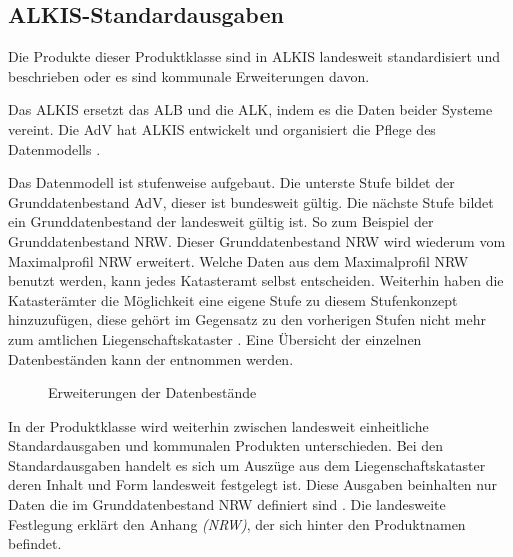 \subsection{ALKIS-Standardausgaben}

Die Produkte dieser Produktklasse sind in \acs{ALKIS} landesweit standardisiert und beschrieben oder es sind kommunale Erweiterungen davon.

Das \acf{ALKIS} ersetzt das \acf{ALB} und die \acf{ALK}, indem es die Daten beider Systeme vereint. Die \acs{AdV} hat \acs{ALKIS} entwickelt und organisiert die Pflege des Datenmodells \autocite[vgl.][]{adv-alkis}.

Das Datenmodell ist stufenweise aufgebaut. Die unterste Stufe bildet der Grunddatenbestand AdV, dieser ist bundesweit gültig. Die nächste Stufe bildet ein Grunddatenbestand der landesweit gültig ist.
So zum Beispiel der Grunddatenbestand NRW. Dieser Grunddatenbestand NRW wird wiederum vom Maximalprofil NRW erweitert.
Welche Daten aus dem Maximalprofil NRW benutzt werden, kann jedes Katasteramt selbst entscheiden.
Weiterhin haben die Katasterämter die Möglichkeit eine eigene Stufe zu diesem Stufenkonzept hinzuzufügen, diese gehört im Gegensatz zu den vorherigen Stufen nicht mehr zum amtlichen Liegenschaftskataster \autocite[vgl.][1-4]{bezk-grunddaten}. Eine Übersicht der einzelnen Datenbeständen kann der  entnommen werden. 

\begin{figure}[htbp]
	\centering
	\caption{Erweiterungen der Datenbestände}
	\label{fig:prod-stufen}
\end{figure}

In der Produktklasse wird weiterhin zwischen landesweit einheitliche Standardausgaben und kommunalen Produkten unterschieden. Bei den Standardausgaben handelt es sich um Auszüge aus dem Liegenschaftskataster deren Inhalt und Form landesweit festgelegt ist. Diese Ausgaben beinhalten nur Daten die im Grunddatenbestand NRW definiert sind \autocite[vgl.][8]{bezk-grunddaten}. Die landesweite Festlegung erklärt den Anhang \textit{(NRW)}, der sich hinter den Produktnamen befindet.


